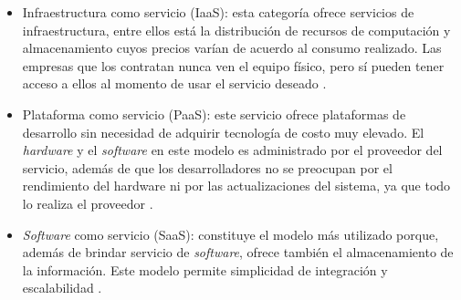 \begin{itemize}
\item Infraestructura como servicio (IaaS): esta categoría ofrece servicios de infraestructura, entre ellos está la distribución de recursos de computación y almacenamiento cuyos precios varían de acuerdo al consumo realizado. Las empresas que los contratan nunca ven el equipo físico, pero sí pueden tener acceso a ellos al momento de usar el servicio deseado \citep{BOOK:2}.




\item Plataforma como servicio (PaaS): este servicio ofrece plataformas de desarrollo sin necesidad de adquirir tecnología de costo muy elevado. El \emph{hardware} y el \emph{software} en este modelo es administrado por el proveedor del servicio, además de que los desarrolladores no se preocupan por el rendimiento del hardware ni por las actualizaciones del sistema, ya que todo lo realiza el proveedor \citep{BOOK:2}.
 





\item \emph{Software} como servicio (SaaS): constituye el modelo más utilizado porque, además de brindar servicio de \emph{software}, ofrece también el almacenamiento de la información. Este modelo permite simplicidad de integración y escalabilidad \citep{BOOK:2}. 




\end{itemize}

